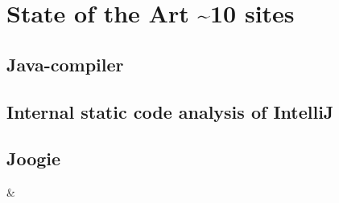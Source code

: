 
\chapter{State of the Art \textasciitilde 10 sites}
\label{cha:state of the art}

\section{Java-compiler}
\label{sec:java compiler}

\section{Internal static code analysis of IntelliJ}
\label{sec:intelliJ}

\section{Joogie}
\label{sec:sca paper}

\cite{arltJoogieInfeasibleCode2012} \& \cite{arltJoogieJavaJimple2013}